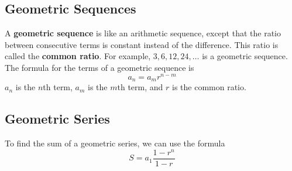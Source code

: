 \documentclass{article}
\begin{document}
    \subsection*{Geometric Sequences}
    A \textbf{geometric sequence} is like an arithmetic sequence, except that
    the ratio between consecutive terms is constant instead of the difference.
    This ratio is called the \textbf{common ratio}. For example, $3, 6, 12, 24,
    \dots$ is a geometric sequence. The formula for the terms of a geometric
    sequence is
    \[a_n = a_mr^{n - m}\] $a_n$ is the $n$th term, $a_m$ is the $m$th term, and
    $r$ is the common ratio.
    \subsection*{Geometric Series}
    To find the sum of a geometric series, we can use the formula
    \[S = a_1\frac{1 - r^n}{1 - r}\]
\end{document}
